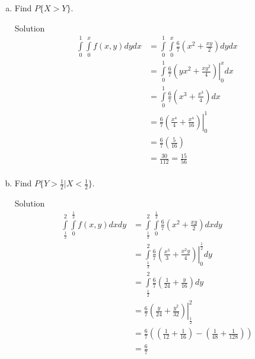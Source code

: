 \documentclass{article}
\begin{document}
\begin{spacing}{1.1}
\begin{homeworkProblem}
\begin{enumerate}[(a)]
\begin{homeworkSection}{Solution}
\begin{align*}
          &= \frac{ 6}{ 7} \left(2 x^2 + x \right)\\
        \end{align*}
      \end{homeworkSection}
    \item Find $P\{ X > Y\}$.
      \begin{homeworkSection}{Solution}
        \begin{align*}
          \int\limits_0^1 \int\limits_0^x f( x, y) dy dx
          &= \int\limits_0^1 \int\limits_0^x \frac{ 6}{ 7} \left(x^2 + \frac{ x y}{ 2}\right) dy dx\\
          &= \int\limits_0^1 
            \left.\frac{ 6}{ 7} \left( y x^2 + \frac{ x y^2}{ 4}\right)\right|_0^x dx\\
          &= \int\limits_0^1 \frac{ 6}{ 7} \left( x^3 + \frac{ x^3}{ 4}\right) dx\\
          &= \left.\frac{ 6}{ 7} \left( \frac{ x^4}{ 4} + \frac{ x^4}{ 16}\right)\right|_0^1\\
          &= \frac{ 6}{ 7} \left(\frac{ 5}{ 16}\right)\\
          &= \frac{ 30}{ 112} = \frac{ 15}{ 56}\\
        \end{align*}
      \end{homeworkSection}
    \item Find $P\{ Y > \frac{ 1}{ 2}| X < \frac{ 1}{ 2}\}$.
      \begin{homeworkSection}{Solution}
        \begin{align*}
          \int\limits_\frac{ 1}{ 2}^2 \int\limits_0^\frac{ 1}{ 2} f( x, y) dx dy
          &= \int\limits_\frac{ 1}{ 2}^2 \int\limits_0^\frac{ 1}{ 2} 
            \frac{ 6}{ 7} \left(x^2 + \frac{ x y}{ 2}\right) dx dy\\
          &= \int\limits_\frac{ 1}{ 2}^2 \frac{ 6}{ 7} 
            \left.\left(\frac{ x^3}{ 3} + \frac{ x^2 y}{ 4}\right)\right|_0^\frac{ 1}{ 2} dy\\
          &= \int\limits_\frac{ 1}{ 2}^2 
            \frac{ 6}{ 7} \left(\frac{ 1}{ 24} + \frac{y}{ 16}\right) dy\\
          &= \frac{ 6}{ 7} 
            \left.\left(\frac{ y}{ 24} + \frac{y^2}{ 32}\right)\right|_\frac{ 1}{ 2}^2\\
          &= \frac{ 6}{ 7} 
            \left(\left(\frac{ 1}{ 12} + \frac{1}{ 16}\right) 
            - \left(\frac{ 1}{ 48} + \frac{1}{ 128}\right)\right)\\
          &= \frac{ 6}{ 7} 

\end{align*}
\end{homeworkSection}
\end{enumerate}
\end{homeworkProblem}
\end{spacing}
\end{document}
